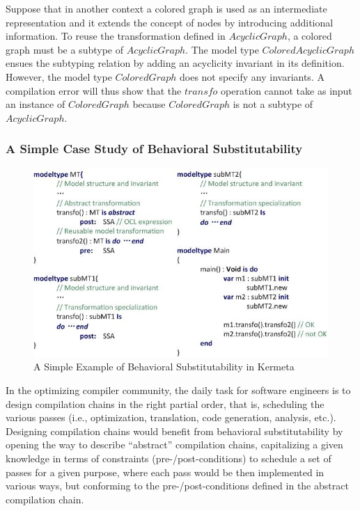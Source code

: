 Suppose that in another context a colored graph is used as an intermediate representation and it extends the concept of nodes by introducing additional information. 
To reuse the transformation defined in $AcyclicGraph$, a colored graph must be a subtype of $AcyclicGraph$. 
The model type $ColoredAcyclicGraph$ ensues the subtyping relation by adding an acyclicity invariant in its definition. However, the model type $ColoredGraph$ does not specify any invariants. 
A compilation error will thus show that the $transfo$ operation cannot take as input an instance of $ColoredGraph$ because $ColoredGraph$ is not a subtype of $AcyclicGraph$. 


\subsubsection{A Simple Case Study of Behavioral Substitutability}

\begin{figure}[!t]
\centering
\includegraphics[width=4.8in]{fig/CaseStudy2.jpg}
\caption{A Simple Example of Behavioral Substitutability in Kermeta}
\label{fig:casestudy2}
\end{figure}

In the optimizing compiler community, the daily task for software engineers is to design compilation chains in the right partial order, that is, scheduling the various passes (i.e., optimization, translation, code generation, analysis, etc.).
Designing compilation chains would benefit from behavioral substitutability by opening the way to describe ``abstract'' compilation chains, capitalizing a given knowledge in terms of constraints (pre-/post-conditions) to schedule a set of passes for a given purpose, where each pass would be then implemented in various ways, but conforming to the pre-/post-conditions defined in the abstract compilation chain.    

